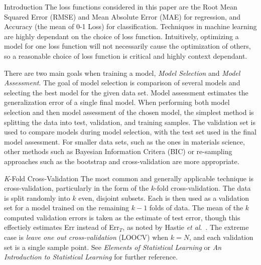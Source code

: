 \documentclass[onecolumn,abstract,paper=letter]{scrartcl}
\newcommand{\etal}{\textit{et al}.\ }
\begin{document}
\begin{section}{Introduction}
The loss functions considered in this paper are the Root Mean Squared Error (RMSE) and Mean Absolute Error (MAE) for regression, and Accuracy (the mean of 0-1 Loss) for classification.
Techniques in machine learning are highly dependant on the choice of loss function.
Intuitively, optimizing a model for one loss function will not necessarily cause the optimization of others, so a reasonable choice of loss function is critical and highly context dependant.

There are two main goals when training a model, \textit{Model Selection} and \textit{Model Assessment}.
The goal of model selection is comparison of several models and selecting the best model for the given data set. 
Model assessment estimates the generalization error of a single final model. 
When performing both model selection and then model assessment of the chosen model, the simplest method is splitting the data into test, validation, and training samples. 
The validation set is used to compare models during model selection, with the test set used in the final model assessment.
For smaller data sets, such as the ones in materials science, other methods such as Bayesian Information Critera (BIC) or re-sampling approaches such as the bootstrap and cross-validation are more appropriate.


\begin{subsection}{\textit{K}-Fold Cross-Validation}
The most common and generally applicable technique is cross-validation, particularly in the form of the $k$-fold cross-validation.
The data is split randomly into $k$ even, disjoint subsets. Each is then used as a validation set for a model trained on the remaining $k-1$ folds of data.
The mean of the $k$ computed validation errors is taken as the estimate of test error, though this effectiely estimates Err instead of Err$_T$, as noted by Hastie \etal \cite{hastie2009}.
The extreme case is \textit{leave one out cross-validation} (LOOCV) when $k=N$, and each validation set is a single sample point.
See \textit{Elements of Statistical Learning} \cite{hastie2009} or \textit{An Introduction to Statistical Learning} \cite{james2013} for further reference.


\end{subsection}
\end{section}
\end{document}
